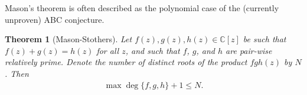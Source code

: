 \documentclass[12pt]{article}
\newtheorem{Theo}{Theorem}
\newcommand{\mb}{\mathbb}
\newcommand{\C}{\mb{C}}
\newcommand{\<}{\langle}
\renewcommand{\>}{\rangle}
\begin{document}
Mason's theorem is often described as the polynomial case of the (currently unproven) ABC conjecture.

\begin{Theo}[Mason-Stothers]
Let $f(z),g(z),h(z)\in\C[z]$ be such that $f(z)+g(z)=h(z)$ for all $z$, and such that $f$, $g$, and $h$ are pair-wise relatively prime.  Denote the number of distinct roots of the product $fgh(z)$ by $N$.  Then
\begin{align*}
\max\deg\{f,g,h\}+1\leq N.
\end{align*}
\end{Theo}
\end{document}
